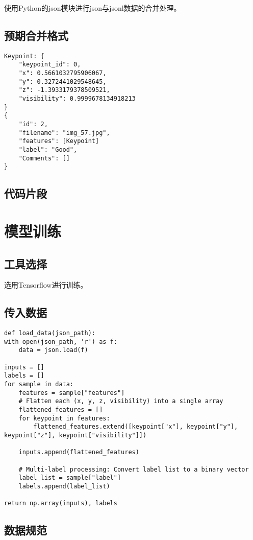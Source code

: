 使用Python的json模块进行json与jsonl数据的合并处理。

\subsection{预期合并格式}
\begin{lstlisting}
Keypoint: {
    "keypoint_id": 0,
    "x": 0.5661032795906067,
    "y": 0.3272441029548645,
    "z": -1.3933179378509521,
    "visibility": 0.9999678134918213
}
{
    "id": 2,
    "filename": "img_57.jpg",
    "features": [Keypoint]
    "label": "Good",
    "Comments": []
}
\end{lstlisting}

\subsection{代码片段}

\section{模型训练}

\subsection{工具选择}

选用Tensorflow进行训练。

\subsection{传入数据}

\begin{lstlisting}
def load_data(json_path):
with open(json_path, 'r') as f:
    data = json.load(f)

inputs = []
labels = []
for sample in data:
    features = sample["features"]
    # Flatten each (x, y, z, visibility) into a single array
    flattened_features = []
    for keypoint in features:
        flattened_features.extend([keypoint["x"], keypoint["y"], keypoint["z"], keypoint["visibility"]])

    inputs.append(flattened_features)

    # Multi-label processing: Convert label list to a binary vector
    label_list = sample["label"]
    labels.append(label_list)

return np.array(inputs), labels
\end{lstlisting}

\subsection{数据规范}

